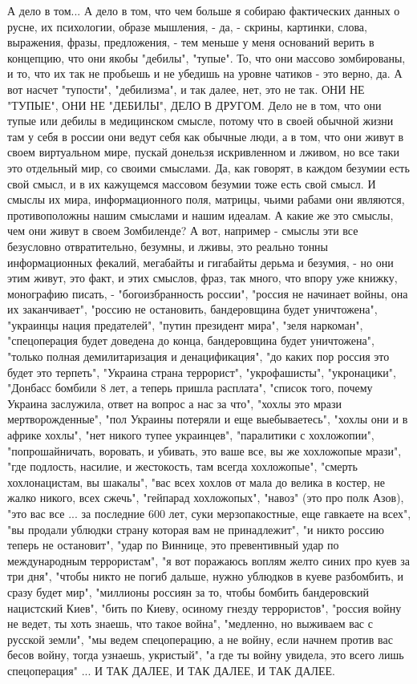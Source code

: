 А дело в том... А дело в том, что чем больше я собираю фактических данных о
русне, их психологии, образе мышления, - да, - скрины, картинки, слова,
выражения, фразы, предложения, - тем меньше у меня оснований верить в
концепцию, что они якобы "дебилы", "тупые". То, что они массово зомбированы, и
то, что их так не пробьешь и не убедишь на уровне чатиков - это верно, да. А
вот насчет "тупости", "дебилизма", и так далее, нет, это не так. ОНИ НЕ
"ТУПЫЕ", ОНИ НЕ "ДЕБИЛЫ", ДЕЛО В ДРУГОМ. Дело не в том, что они тупые или
дебилы в медицинском смысле, потому что в своей обычной жизни там у себя в россии
они ведут себя как обычные люди, а в том, что они живут в своем виртуальном мире,
пускай донельзя искривленном и лживом, но все таки это отдельный мир, со своими
смыслами. Да, как говорят, в каждом безумии есть свой смысл, и в их кажущемся
массовом безумии тоже есть свой смысл. И смыслы их мира, информационного поля,
матрицы, чьими рабами они являются, противоположны нашим смыслами и нашим
идеалам. А какие же это смыслы, чем они живут в своем Зомбиленде?  А вот,
например - смыслы эти все безусловно отвратительно, безумны, и лживы, это
реально тонны информационных фекалий, мегабайты и гигабайты дерьма и безумия, -
но они этим живут, это факт, и этих смыслов, фраз, так много, что впору уже
книжку, монографию писать, - "богоизбранность россии", "россия не начинает
войны, она их заканчивает", "россию не остановить, бандеровщина будет
уничтожена", "украинцы нация предателей", "путин президент мира", "зеля
наркоман", "спецоперация будет доведена до конца, бандеровщина будет
уничтожена", "только полная демилитаризация и денацификация", "до каких пор
россия это будет это терпеть", "Украина страна террорист", "укрофашисты",
"укронацики", "Донбасс бомбили 8 лет, а теперь пришла расплата", "список того,
почему Украина заслужила, ответ на вопрос а нас за что", "хохлы это мрази
мертворожденные", "пол Украины потеряли и еще выебываетесь", "хохлы они и в
африке хохлы", "нет никого тупее украинцев", "паралитики с хохложопии",
"попрошайничать, воровать, и убивать, это ваше все, вы же хохложопые мрази",
"где подлость, насилие, и жестокость, там всегда хохложопые", "смерть
хохлонацистам, вы шакалы", "вас всех хохлов от мала до велика в костер, не
жалко никого, всех сжечь", "гейпарад хохложопых", "навоз" (это про полк Азов),
"это вас все ... за последние 600 лет, суки мерзопакостные, еще гавкаете на
всех", "вы продали ублюдки страну которая вам не принадлежит", "и никто россию
теперь не остановит", "удар по Виннице, это превентивный удар по международным
террористам", "я вот поражаюсь воплям желто синих про куев за три дня", "чтобы
никто не погиб дальше, нужно ублюдков в куеве разбомбить, и сразу будет мир",
"миллионы россиян за то, чтобы бомбить бандеровский нацистский Киев", "бить по
Киеву, осиному гнезду террористов", "россия войну не ведет, ты хоть знаешь, что
такое война", "медленно, но выживаем вас с русской земли", "мы ведем
спецоперацию, а не войну, если начнем против вас бесов войну, тогда узнаешь,
укристый", "а где ты войну увидела, это всего лишь спецоперация" ...   
И ТАК ДАЛЕЕ, И ТАК ДАЛЕЕ, И ТАК ДАЛЕЕ.

